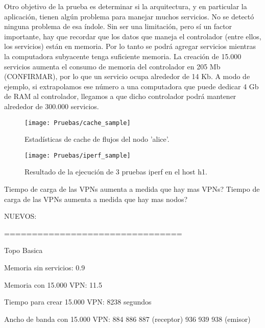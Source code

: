 Otro objetivo de la prueba es determinar si la arquitectura, y en particular la aplicación, tienen algún problema para manejar muchos servicios. No se detectó ninguna problema de esa índole. Sin ser una limitación, pero sí un factor importante, hay que recordar que los datos que maneja el controlador (entre ellos, los servicios) están en memoria. Por lo tanto se podrá agregar servicios mientras la computadora subyacente tenga suficiente memoria. La creación de 15.000 servicios aumenta el consumo de memoria del controlador en 205 Mb (CONFIRMAR), por lo que un servicio ocupa alrededor de 14 Kb. A modo de ejemplo, si extrapolamos ese número a una computadora que puede dedicar 4 Gb de RAM al controlador, llegamos a que dicho controlador podrá mantener alrededor de 300.000 servicios.


\begin{figure}[t]
	\caption{Estadísticas de cache de flujos del nodo 'alice'.}
	\texttt{[image: Pruebas/cache\_sample]}
	\centering
	\label{fig:cache_sample}
\end{figure}

\begin{figure}[t]
	\caption{Resultado de la ejecución de 3 pruebas iperf en el host h1.}
	\texttt{[image: Pruebas/iperf\_sample]}
	\centering
	\label{fig:iperf_sample}
\end{figure}

Tiempo de carga de las VPNs aumenta a medida que hay mas VPNs?
Tiempo de carga de las VPNs aumenta a medida que hay mas nodos?

NUEVOS:

================================

Topo Basica

Memoria sin servicios: 0.9%

Memoria con 15.000 VPN: 11.5%

Tiempo para crear 15.000 VPN: 8238 segundos

Ancho de banda con 15.000 VPN: 884 886 887 (receptor) 936 939 938 (emisor)
